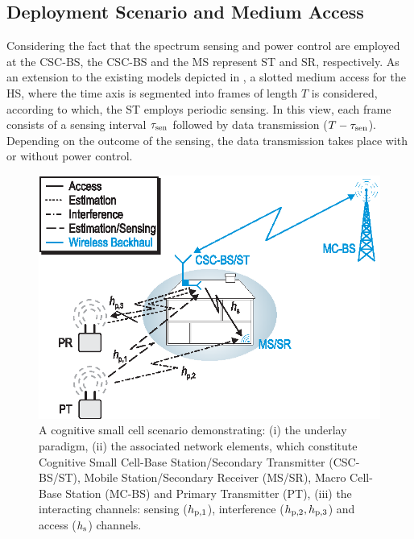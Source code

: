 \subsection{Deployment Scenario and Medium Access}
Considering the fact that the spectrum sensing and power control are employed at the CSC-BS, the CSC-BS and the MS represent ST and SR, respectively. As an extension to the existing models depicted in \cite{Kang09, Sharma14}, a slotted medium access for the HS, where the time axis is segmented into frames of length $T$ is considered, according to which, the ST employs periodic sensing. In this view, each frame consists of a sensing interval $\tau_{\text{sen}}$ followed by data transmission ($T - \tau_{\text{sen}}$). Depending on the outcome of the sensing, the data transmission takes place  with or without power control. 
\begin{figure}[!t]
\centering
\includegraphics[width = \figscalet]{figures/CR_Scenario_Hybrid}
\caption{A cognitive small cell scenario demonstrating: (i) the underlay paradigm, (ii) the associated network elements, which constitute Cognitive Small Cell-Base Station/Secondary Transmitter (CSC-BS/ST), Mobile Station/Secondary Receiver (MS/SR), Macro Cell-Base Station (MC-BS) and Primary Transmitter (PT), (iii) the interacting channels: sensing ($h_{\text{p,1}}$), interference ($h_{\text{p,2}}, h_{\text{p,3}}$) and access ($h_{\text{s}}$) channels.}
\label{fig:scenario}
\end{figure}

